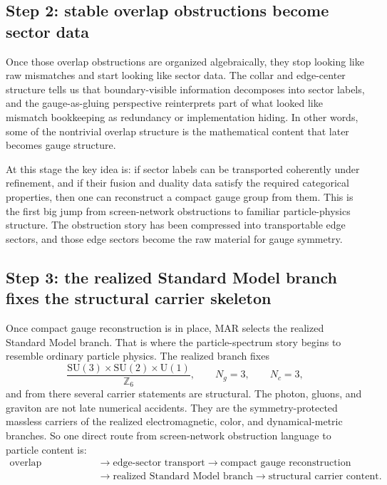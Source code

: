 \documentclass[11pt]{article}
\newcommand{\SU}{\mathrm{SU}}
\newcommand{\U}{\mathrm{U}}
\begin{document}
\subsection{Step 2: stable overlap obstructions become sector data}

Once those overlap obstructions are organized algebraically, they stop looking like raw
mismatches and start looking like sector data. The collar and edge-center structure tells us that
boundary-visible information decomposes into sector labels, and the gauge-as-gluing perspective
reinterprets part of what looked like mismatch bookkeeping as redundancy or implementation
hiding. In other words, some of the nontrivial overlap structure is the
mathematical content that later becomes gauge structure.

At this stage the key idea is: if sector labels can be transported coherently under refinement,
and if their fusion and duality data satisfy the required categorical properties, then one can
reconstruct a compact gauge group from them. This is the first big jump from screen-network
obstructions to familiar particle-physics structure. The obstruction story has been compressed
into transportable edge sectors, and those edge sectors become the raw material for gauge
symmetry.

\subsection{Step 3: the realized Standard Model branch fixes the structural carrier skeleton}

Once compact gauge reconstruction is in place, MAR selects the realized Standard Model branch.
That is where the particle-spectrum story begins to resemble ordinary particle physics. The
realized branch fixes
\[
\frac{\SU(3)\times\SU(2)\times\U(1)}{\mathbb Z_6},
\qquad
N_g=3,
\qquad
N_c=3,
\]
and from there several carrier statements are structural. The photon, gluons, and
graviton are not late numerical accidents. They are the symmetry-protected massless carriers of
the realized electromagnetic, color, and dynamical-metric branches. So one direct route from
screen-network obstruction language to particle content is:
\[
\begin{aligned}
\text{overlap obstruction}
&\to \text{edge-sector transport}
\to \text{compact gauge reconstruction} \\
&\to \text{realized Standard Model branch}
\to \text{structural carrier content}.
\end{aligned}
\]
\end{document}
